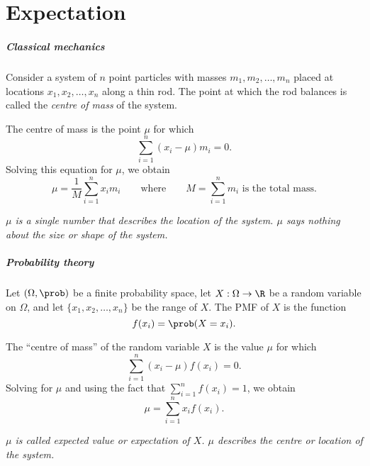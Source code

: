 \chapter{Expectation}\label{chap:expe}


\paragraph{Classical mechanics}
Consider a system of $n$ point particles with masses $m_1,m_2,\ldots,m_n$ placed at locations $x_1,x_2,\ldots,x_n$ along a thin rod. 
The point at which the rod balances is called the \emph{centre of mass} of the system.

\bigskip
The centre of mass is the point $\mu$ for which
\[
\sum_{i=1}^n (x_i-\mu)m_i = 0.
\]
Solving this equation for $\mu$, we obtain
\[
\mu = \frac{1}{M}\sum_{i=1}^n x_im_i\qquad\text{where}\qquad M = \sum_{i=1}^n m_i \text{ is the total mass}.
\]

\bit
\it $\mu$ is a single number that describes the \emph{location} of the system.
\it $\mu$ says nothing about the \emph{size} or \emph{shape} of the system.
\eit
	
\paragraph{Probability theory}
Let $(\Omega,\prob)$ be a finite probability space, let $X:\Omega\to\R$ be a random variable on $\Omega$, and let $\{x_1,x_2,\ldots,x_n\}$ be the range of $X$.
The PMF of $X$ is the function
\[
f(x_i) = \prob(X=x_i).
\]

The ``centre of mass'' of the random variable $X$ is the value $\mu$ for which
\[
\sum_{i=1}^n (x_i-\mu)f(x_i) = 0.
\]
Solving for $\mu$ and using the fact that $\sum_{i=1}^n f(x_i) = 1$, we obtain
\[
\mu = \sum_{i=1}^n x_i f(x_i).
\]

\bit
\it $\mu$ is called \emph{expected value} or \emph{expectation} of $X$.
\it $\mu$ describes the \emph{centre} or \emph{location} of the system.
\eit

